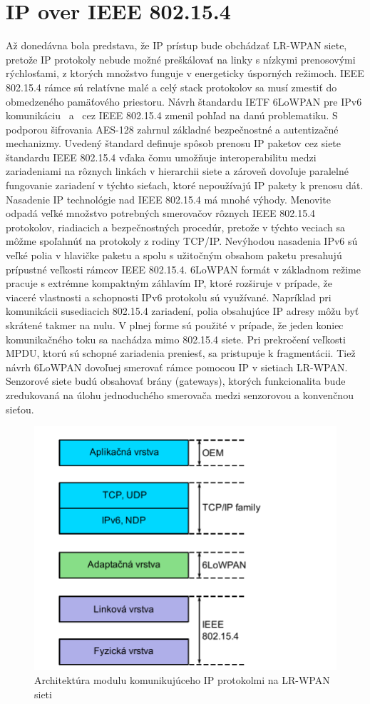 \section{IP over IEEE 802.15.4}
\indent\indent Až donedávna bola predstava, že IP prístup bude obchádzať LR-WPAN siete, pretože IP protokoly nebude možné preškálovať na linky s nízkymi prenosovými rýchlosťami, z ktorých množstvo funguje v energeticky úsporných režimoch. IEEE 802.15.4 rámce sú relatívne malé a celý stack protokolov sa musí zmestiť do obmedzeného pamäťového priestoru. Návrh štandardu IETF 6LoWPAN pre IPv6 komunikáciu~\cite{rfc_4919} a~\cite{rfc_4944} cez IEEE 802.15.4 zmenil pohľad na danú problematiku. S podporou šifrovania AES-128 zahrnul základné bezpečnostné a autentizačné mechanizmy. Uvedený štandard definuje spôsob prenosu IP paketov cez siete štandardu IEEE 802.15.4 vďaka čomu umožňuje interoperabilitu medzi zariadeniami na rôznych linkách v hierarchii siete a zároveň dovoľuje paralelné fungovanie zariadení v týchto sieťach, ktoré nepoužívajú IP pakety k prenosu dát.\\
\indent Nasadenie IP technológie nad IEEE 802.15.4 má mnohé výhody. Menovite odpadá veľké množstvo potrebných smerovačov rôznych IEEE 802.15.4 protokolov, riadiacich a bezpečnostných procedúr, pretože v týchto veciach sa môžme spoľahnúť na protokoly z rodiny TCP/IP. Nevýhodou nasadenia IPv6 sú veľké polia v hlavičke paketu a spolu s užitočným obsahom paketu presahujú prípustné veľkosti rámcov IEEE 802.15.4. 6LoWPAN formát v základnom režime pracuje s extrémne kompaktným záhlavím IP, ktoré rozširuje v prípade, že viaceré vlastnosti a schopnosti IPv6 protokolu sú využívané. Napríklad pri komunikácii susediacich 802.15.4 zariadení, polia obsahujúce IP adresy môžu byť skrátené takmer na nulu. V plnej forme sú použité v prípade, že jeden koniec komunikačného toku sa nachádza mimo 802.15.4 siete. Pri prekročení veľkosti MPDU, ktorú sú schopné zariadenia preniesť, sa pristupuje k fragmentácii. Tiež návrh 6LoWPAN dovoľuej smerovať rámce pomocou IP v sietiach LR-WPAN. Senzorové siete budú obsahovať brány (gateways), ktorých funkcionalita bude zredukovaná na úlohu jednoduchého smerovača medzi senzorovou a konvenčnou sieťou.\\

\begin{figure}[htbp]
\begin{center}
\includegraphics[width=120mm]{figures/ip_ieee}
\caption{Architektúra modulu komunikujúceho IP protokolmi na LR-WPAN sieti}
\label{fig:ip_ieee}
\end{center}
\end{figure}